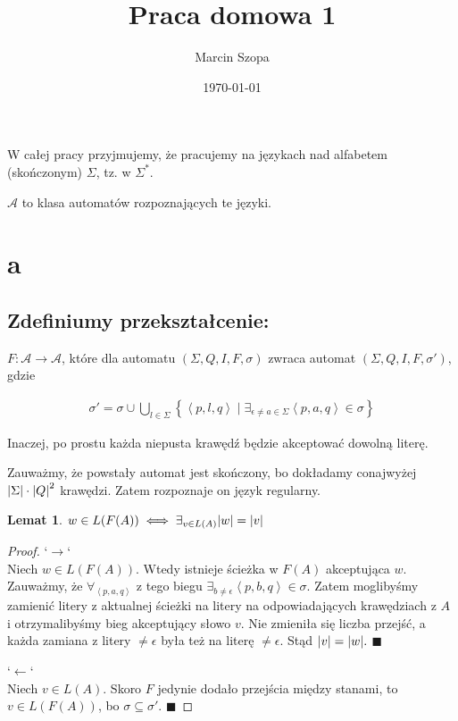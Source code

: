 \documentclass{article}
\title{Praca domowa 1}
\author{Marcin Szopa}
\date{\today}
\newtheorem{lemma}[theorem]{Lemat}
\theoremstyle{definition}
\theoremstyle{remark}
\begin{document}
\maketitle

W całej pracy przyjmujemy, że pracujemy na językach nad alfabetem (skończonym) \(\Sigma\), tz. w \( \Sigma^* \).

\(\mathcal{A}\) to klasa automatów rozpoznających te języki.

\section{a}

\subsection{Zdefiniumy przekształcenie:}

\(F: \mathcal{A} \to \mathcal{A}\), które dla automatu \(\left(\Sigma, Q, I, F, \sigma\right)\) zwraca automat \(\left(\Sigma, Q, I, F, \sigma'\right)\), gdzie

\begin{align*}
\sigma' = \sigma \cup \bigcup_{l \in \Sigma} \left\{ \left< p, l, q \right> \mid \exists_{\epsilon \neq a \in \Sigma}{\left< p, a, q \right> \in \sigma} \right\}
\end{align*}

Inaczej, po prostu każda niepusta krawędź będzie akceptować dowolną literę. 

Zauważmy, że powstały automat jest skończony, bo dokładamy conajwyżej \(\abs{\Sigma} \cdot \abs{Q}^2\) krawędzi. Zatem rozpoznaje on język regularny.

\begin{lemma}
    \(w \in L(F(A)) \iff \exists_{v \in L(A)} \abs{w}=\abs{v}\)
\end{lemma}
\begin{proof}

`\(\rightarrow\)` \\
Niech \(w \in L(F(A))\). Wtedy istnieje ścieżka w \(F(A)\) akceptująca \(w\). Zauważmy, że \(\forall_{\left< p, a, q \right>}\) z tego biegu \( \exists_{b \neq \epsilon} \left< p, b, q \right> \in \sigma\). Zatem moglibyśmy zamienić litery z aktualnej ścieżki na litery na odpowiadających krawędziach z \(A\) i otrzymalibyśmy bieg akceptujący słowo \(v\). Nie zmieniła się liczba przejść, a każda zamiana z litery \(\neq \epsilon\) była też na literę \(\neq \epsilon\). Stąd \(\abs{v}=\abs{w}.\) \(\blacksquare\)

`\(\leftarrow\)` \\
Niech \(v \in L(A)\). Skoro \(F\) jedynie dodało przejścia między stanami, to \(v \in L(F(A))\), bo \(\sigma \subseteq \sigma'\). \(\blacksquare\)

\end{proof}
\end{document}
